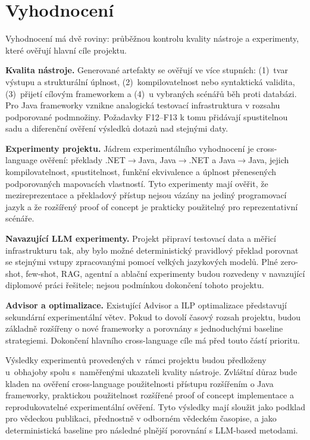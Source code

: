 \documentclass{article}
\begin{document}
\section{Vyhodnocení}\label{sec:eval}

Vyhodnocení má dvě roviny: průběžnou kontrolu kvality nástroje a experimenty, které ověřují hlavní cíle projektu.

\textbf{Kvalita nástroje.} Generované artefakty se ověřují ve více stupních: (1)~tvar výstupu a strukturální úplnost, (2)~kompilovatelnost nebo syntaktická validita, (3)~přijetí cílovým frameworkem a (4)~u vybraných scénářů běh proti databázi. Pro Java frameworky vznikne analogická testovací infrastruktura v rozsahu podporované podmnožiny. Požadavky F12--F13 k tomu přidávají spustitelnou sadu a diferenční ověření výsledků dotazů nad stejnými daty.

\textbf{Experimenty projektu.} Jádrem experimentálního vyhodnocení je cross-language ověření: překlady .NET$\to$Java, Java$\to$.NET a Java$\to$Java, jejich kompilovatelnost, spustitelnost, funkční ekvivalence a úplnost přenesených podporovaných mapovacích vlastností. Tyto experimenty mají ověřit, že mezireprezentace a překladový přístup nejsou vázány na jediný programovací jazyk a že rozšířený proof of concept je prakticky použitelný pro reprezentativní scénáře.

\textbf{Navazující LLM experimenty.} Projekt připraví testovací data a měřicí infrastrukturu tak, aby bylo možné deterministický pravidlový překlad porovnat se stejnými vstupy zpracovanými pomocí velkých jazykových modelů. Plné zero-shot, few-shot, RAG, agentní a ablační experimenty budou rozvedeny v navazující diplomové práci řešitele; nejsou podmínkou dokončení tohoto projektu.

\textbf{Advisor a optimalizace.} Existující Advisor a ILP optimalizace představují sekundární experimentální větev. Pokud to dovolí časový rozsah projektu, budou základně rozšířeny o nové frameworky a porovnány s jednoduchými baseline strategiemi. Dokončení hlavního cross-language cíle má před touto částí prioritu.

Výsledky experimentů provedených v~rámci projektu budou předloženy u~obhajoby spolu s~naměřenými ukazateli kvality nástroje. Zvláštní důraz bude kladen na ověření cross-language použitelnosti přístupu rozšířením o Java frameworky, praktickou použitelnost rozšířené proof of concept implementace a reprodukovatelné experimentální ověření. Tyto výsledky mají sloužit jako podklad pro vědeckou publikaci, přednostně v odborném vědeckém časopise, a jako deterministická baseline pro následné plnější porovnání s LLM-based metodami.
\end{document}

